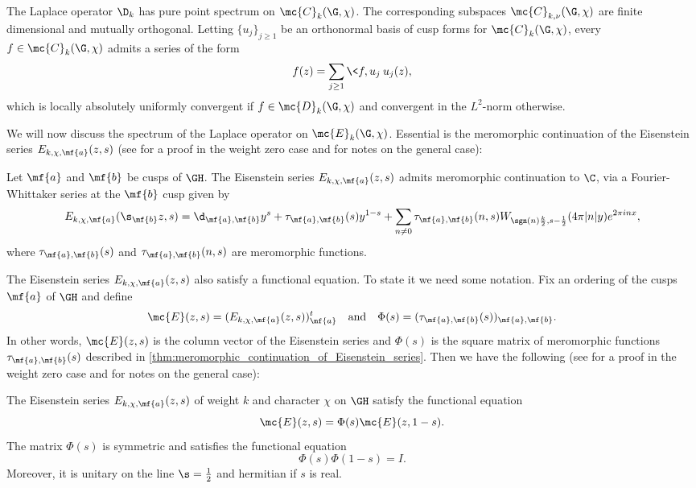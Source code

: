     \begin{theorem}\label{thm:cusp_form_spectrum}
      The Laplace operator $\D_{k}$ has pure point spectrum on $\mc{C}_{k}(\G,\chi)$. The corresponding subspaces $\mc{C}_{k,\nu}(\G,\chi)$ are finite dimensional and mutually orthogonal. Letting $\{u_{j}\}_{j \ge 1}$ be an orthonormal basis of cusp forms for $\mc{C}_{k}(\G,\chi)$, every $f \in \mc{C}_{k}(\G,\chi)$ admits a series of the form
      \[
        f(z) = \sum_{j \ge 1}\<f,u_{j}\>u_{j}(z),
      \]
      which is locally absolutely uniformly convergent if $f \in \mc{D}_{k}(\G,\chi)$ and convergent in the $L^{2}$-norm otherwise.
    \end{theorem}

    We will now discuss the spectrum of the Laplace operator on $\mc{E}_{k}(\G,\chi)$. Essential is the meromorphic continuation of the Eisenstein series $E_{k,\chi,\mf{a}}(z,s)$ (see \cite{iwaniec2002spectral} for a proof in the weight zero case and \cite{duke2002subconvexity} for notes on the general case):

    \begin{theorem}\label{thm:meromorphic_continuation_of_Eisenstein_series}
      Let $\mf{a}$ and $\mf{b}$ be cusps of $\GH$. The Eisenstein series $E_{k,\chi,\mf{a}}(z,s)$ admits meromorphic continuation to $\C$, via a Fourier-Whittaker series at the $\mf{b}$ cusp given by
      \[
        E_{k,\chi,\mf{a}}(\s_{\mf{b}}z,s) = \d_{\mf{a},\mf{b}}y^{s}+\tau_{\mf{a},\mf{b}}(s)y^{1-s}+\sum_{n \neq 0}\tau_{\mf{a},\mf{b}}(n,s)W_{\sgn(n)\frac{k}{2},s-\frac{1}{2}}(4\pi|n|y)e^{2\pi inx},
      \]
      where $\tau_{\mf{a},\mf{b}}(s)$ and $\tau_{\mf{a},\mf{b}}(n,s)$ are meromorphic functions.
    \end{theorem}

    The Eisenstein series $E_{k,\chi,\mf{a}}(z,s)$ also satisfy a functional equation. To state it we need some notation. Fix an ordering of the cusps $\mf{a}$ of $\GH$ and define
    \[
      \mc{E}(z,s) = (E_{k,\chi,\mf{a}}(z,s))_{\mf{a}}^{t} \quad \text{and} \quad \Phi(s) = (\tau_{\mf{a},\mf{b}}(s))_{\mf{a},\mf{b}}.
    \]
    In other words, $\mc{E}(z,s)$ is the column vector of the Eisenstein series and $\Phi(s)$ is the square matrix of meromorphic functions $\tau_{\mf{a},\mf{b}}(s)$ described in \cref{thm:meromorphic_continuation_of_Eisenstein_series}. Then we have the following (see \cite{iwaniec2002spectral} for a proof in the weight zero case and \cite{duke2002subconvexity} for notes on the general case): 

    \begin{theorem}\label{thm:functional_equation_of_Eisenstein_series}
      The Eisenstein series $E_{k,\chi,\mf{a}}(z,s)$ of weight $k$ and character $\chi$ on $\GH$ satisfy the functional equation 
      \[
        \mc{E}(z,s) = \Phi(s)\mc{E}(z,1-s).
      \]
      The matrix $\Phi(s)$ is symmetric and satisfies the functional equation
      \[
        \Phi(s)\Phi(1-s) = I.
      \]
      Moreover, it is unitary on the line $\s = \frac{1}{2}$ and hermitian if $s$ is real.
    \end{theorem}

